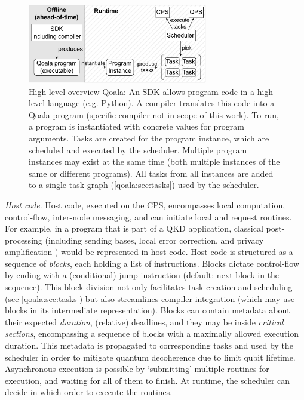 \begin{figure}
    \centering
    \includegraphics[width=0.7\textwidth]{figures/qoala/runtime_overview.pdf}
    \caption{High-level overview Qoala: An SDK allows program code in a high-level language (e.g. Python).
    A compiler translates this code into a Qoala program (specific compiler not in scope of this work).
    To run, a program is instantiated with concrete values for program arguments.
    Tasks are created for the program instance, which are scheduled and executed by the scheduler.
    Multiple program instances may exist at the same time (both multiple instances of the same or different programs).
    All tasks from all instances are added to a single task graph (\cref{qoala:sec:tasks}) used by the scheduler.
    }
    \label{qoala:fig:runtime_overview}
\end{figure}




\textit{Host code}.
Host code, executed on the CPS, encompasses local computation, control-flow, inter-node messaging, and can initiate local and request routines.
For example, in a program that is part of a QKD application, classical post-processing (including sending bases, local error correction, and privacy amplification \cite{vidick2023introduction}) would be represented in host code.
Host code is structured as a sequence of \textit{blocks}, each holding a list of instructions.
Blocks dictate control-flow by ending with a (conditional) jump instruction (default: next block in the sequence).
This block division not only facilitates task creation and scheduling (see \cref{qoala:sec:tasks}) but also streamlines compiler integration (which may use blocks in its intermediate representation).
Blocks can contain metadata about their expected \textit{duration}, (relative) deadlines, and they may be inside \textit{critical sections}, encompassing a sequence of blocks with a maximally allowed execution duration. This metadata is propagated to corresponding tasks and used by the scheduler in order to mitigate quantum decoherence due to limit qubit lifetime.
Asynchronous execution is possible by `submitting' multiple routines for execution, and waiting for all of them to finish. At runtime, the scheduler can decide in which order to execute the routines.


